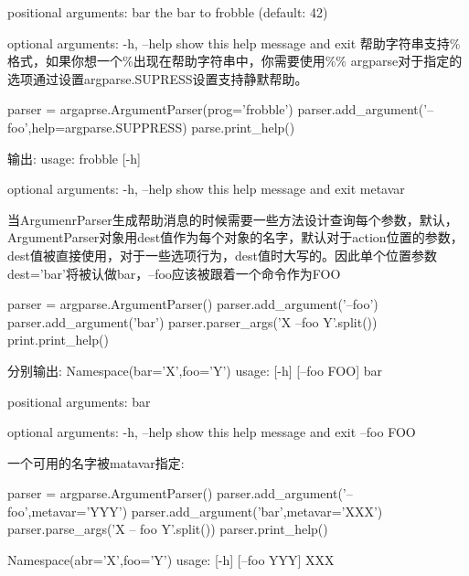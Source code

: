 positional arguments:\newline
 bar     the bar to frobble (default: 42)\newline

optional arguments:\newline
 -h, --help  show this help message and exit\newline
帮助字符串支持\%格式，如果你想一个\%出现在帮助字符串中，你需要使用\%\%
argparse对于指定的选项通过设置argparse.SUPRESS设置支持静默帮助。
\begin{python}
parser = argaprse.ArgumentParser(prog='frobble')
parser.add_argument('--foo',help=argparse.SUPPRESS)
parse.print_help()
\end{python}
输出:\newline
usage: frobble [-h]\newline

optional arguments:\newline
  -h, --help  show this help message and exit\newline
metavar\par
当ArgumenrParser生成帮助消息的时候需要一些方法设计查询每个参数，默认，ArgumentParser对象用dest值作为每个对象的名字，默认对于action位置的参数，dest值被直接使用，对于一些选项行为，dest值时大写的。因此单个位置参数dest='bar'将被认做bar，--foo应该被跟着一个命令作为FOO
\begin{python}
parser = argparse.ArgumentParser()
parser.add_argument('--foo')
parser.add_argument('bar')
parser.parser_args('X --foo Y'.split())
print.print_help()
\end{python}
分别输出:\newline
Namespace(bar='X',foo='Y')\newline
usage:  [-h] [--foo FOO] bar\newline

positional arguments:\newline
 bar\newline

optional arguments:\newline
 -h, --help  show this help message and exit\newline
 --foo FOO\newline

一个可用的名字被matavar指定:
\begin{python}
parser = argparse.ArgumentParser()
parser.add_argument('--foo',metavar='YYY')
parser.add_argument('bar',metavar='XXX')
parser.parse_args('X -- foo Y'.split())
parser.print_help()
\end{python}
Namespace(abr='X',foo='Y')\newline
usage:  [-h] [--foo YYY] XXX\newline

